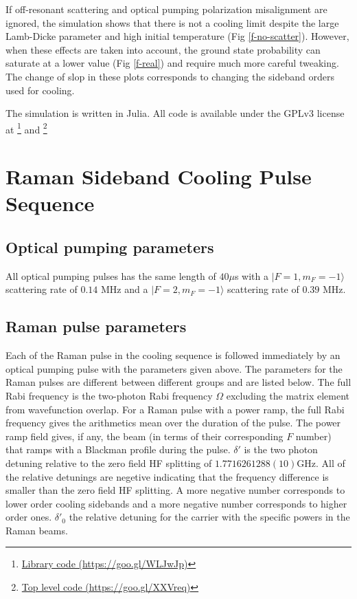 \documentclass[aps,secnumarabic,amsmath,amssymb]{revtex4}
\begin{document}
If off-resonant scattering and optical pumping polarization misalignment are ignored,
the simulation shows that there is not a cooling limit
despite the large Lamb-Dicke parameter and high initial temperature (Fig \ref{f-no-scatter}).
However, when these effects are taken into account, the ground state probability can saturate at
a lower value (Fig \ref{f-real}) and require much more careful tweaking.
The change of slop in these plots corresponds to changing the sideband orders used for cooling.

The simulation is written in Julia\cite{Bezanson2017}.
All code is available under the GPLv3 license at
\footnote{\href{https://goo.gl/WLJwJp}{Library code (https://goo.gl/WLJwJp)}} and
\footnote{\href{https://goo.gl/XXVreq}{Top level code (https://goo.gl/XXVreq)}}

\section{Raman Sideband Cooling Pulse Sequence}

\subsection{Optical pumping parameters}
All optical pumping pulses has the same length of $40\mu$s
with a $|F=1,m_F=-1\rangle$ scattering rate of $0.14$ MHz
and a $|F=2,m_F=-1\rangle$ scattering rate of $0.39$ MHz.

\subsection{Raman pulse parameters}
Each of the Raman pulse in the cooling sequence is followed immediately by an optical pumping
pulse with the parameters given above.
The parameters for the Raman pulses are different between different groups and are listed below.
The full Rabi frequency is the two-photon Rabi frequency $\Omega$ excluding the matrix element
from wavefunction overlap.
For a Raman pulse with a power ramp,
the full Rabi frequency gives the arithmetics mean over the duration of the pulse.
The power ramp field gives, if any,
the beam (in terms of their corresponding $F$ number)
that ramps with a Blackman profile during the pulse.
$\delta'$ is the two photon detuning relative to the zero field HF splitting
of $1.7716261288(10)$GHz.
All of the relative detunings are negetive indicating that the frequency difference is smaller
than the zero field HF splitting.
A more negative number corresponds to lower order cooling sidebands
and a more negative number corresponds to higher order ones.
$\delta'_0$ the relative detuning for the carrier with the specific powers in the Raman beams.
\end{document}
